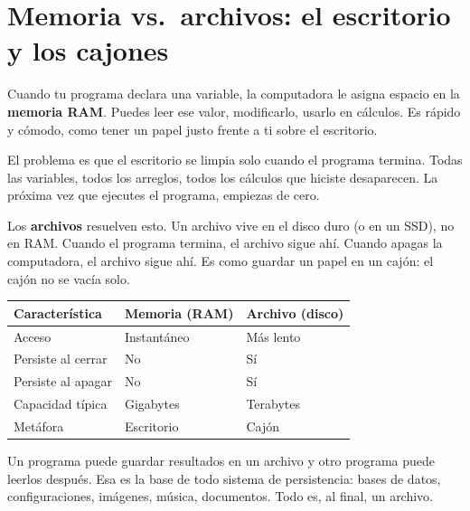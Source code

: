 \documentclass[12pt, oneside]{article}
\begin{document}
\section{Memoria vs.\ archivos: el escritorio y los cajones}

Cuando tu programa declara una variable, la computadora le asigna espacio en
la \textbf{memoria RAM}.  Puedes leer ese valor, modificarlo, usarlo en
cálculos.  Es rápido y cómodo, como tener un papel justo frente a ti sobre
el escritorio.

El problema es que el escritorio se limpia solo cuando el programa termina.
Todas las variables, todos los arreglos, todos los cálculos que hiciste
desaparecen.  La próxima vez que ejecutes el programa, empiezas de cero.

Los \textbf{archivos} resuelven esto.  Un archivo vive en el disco duro (o en
un SSD), no en RAM.  Cuando el programa termina, el archivo sigue ahí.  Cuando
apagas la computadora, el archivo sigue ahí.  Es como guardar un papel en un
cajón: el cajón no se vacía solo.

\begin{center}
\begin{tabular}{lll}
  \toprule
  \textbf{Característica}   & \textbf{Memoria (RAM)} & \textbf{Archivo (disco)} \\
  \midrule
  Acceso                    & Instantáneo            & Más lento \\
  Persiste al cerrar        & No                     & Sí \\
  Persiste al apagar        & No                     & Sí \\
  Capacidad típica          & Gigabytes              & Terabytes \\
  Metáfora                  & Escritorio             & Cajón \\
  \bottomrule
\end{tabular}
\end{center}

\begin{recuerda}
  Un programa puede guardar resultados en un archivo y otro programa puede
  leerlos después.  Esa es la base de todo sistema de persistencia: bases
  de datos, configuraciones, imágenes, música, documentos.  Todo es, al
  final, un archivo.
\end{recuerda}
\end{document}
